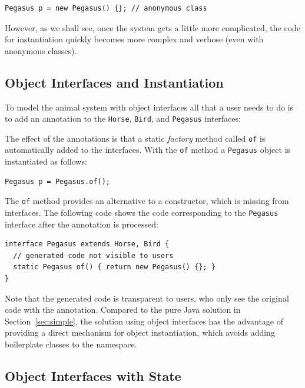 \begin{lstlisting}
Pegasus p = new Pegasus() {}; // anonymous class
\end{lstlisting}

\noindent However, as we shall see, once the system gets a little more
complicated, the code for instantiation quickly becomes more
complex and verbose (even with anonymous classes).

\subsection{Object Interfaces and Instantiation}

To model the animal system with object interfaces all that a user
needs to do is to add an \mixinAnn{} annotation to the \texttt{Horse},
\texttt{Bird}, and \texttt{Pegasus} interfaces:

\noindent The effect of the annotations is that a static \emph{factory} method called
\texttt{of} is automatically added to the interfaces. With the
\texttt{of} method a \texttt{Pegasus} object is instantiated as follows:

\begin{lstlisting}
Pegasus p = Pegasus.of();
\end{lstlisting}

\noindent The \texttt{of} method provides an alternative to a
constructor, which is missing from interfaces. The following code
shows the code corresponding to the \texttt{Pegasus} interface
after the \mixinAnn{} annotation is processed:

\begin{lstlisting}
interface Pegasus extends Horse, Bird {
  // generated code not visible to users
  static Pegasus of() { return new Pegasus() {}; }
}
\end{lstlisting}

\noindent Note that the generated code is transparent to users, who
only see the original code with the \mixin annotation. Compared to the pure
Java solution in Section~\ref{sec:simple}, the solution using object interfaces
has the advantage of providing a direct mechanism for object
instantiation, which avoids adding boilerplate classes to the
namespace.

\subsection{Object Interfaces with State}

